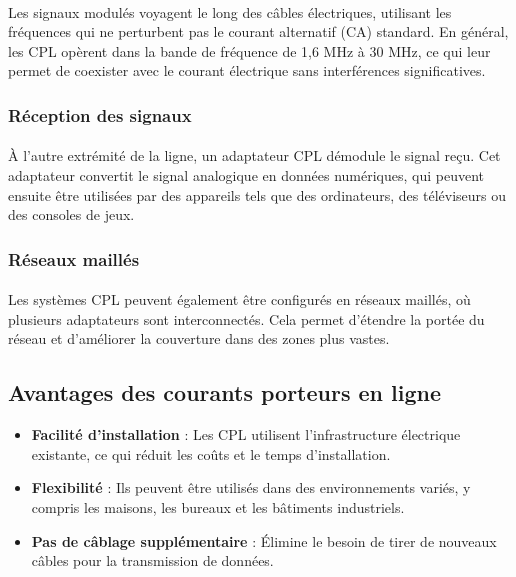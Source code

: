 \documentclass[a4paper,twocolumn]{report}
\begin{document}
\paragraph{} Les signaux modulés voyagent le long des câbles électriques,
utilisant les fréquences qui ne perturbent pas le courant alternatif (CA) standard.
En général, les CPL opèrent dans la bande de fréquence de 1,6 MHz à 30 MHz,
ce qui leur permet de coexister avec le courant électrique sans interférences significatives.

\subsubsection{Réception des signaux}
\paragraph{} À l'autre extrémité de la ligne, un adaptateur CPL démodule le signal reçu.
Cet adaptateur convertit le signal analogique en données numériques,
qui peuvent ensuite être utilisées par des appareils tels que des ordinateurs,
des téléviseurs ou des consoles de jeux.

\subsubsection{Réseaux maillés}
\paragraph{} Les systèmes CPL peuvent également être configurés en réseaux maillés,
où plusieurs adaptateurs sont interconnectés. Cela permet d'étendre la portée du réseau
et d'améliorer la couverture dans des zones plus vastes.

\subsection{Avantages des courants porteurs en ligne}
\begin{itemize}
	\item \textbf{Facilité d'installation} : Les CPL utilisent l'infrastructure
    électrique existante, ce qui réduit les coûts et le temps d'installation.
	\item \textbf{Flexibilité} : Ils peuvent être utilisés dans des environnements variés,
    y compris les maisons, les bureaux et les bâtiments industriels.
	\item \textbf{Pas de câblage supplémentaire} : Élimine le besoin de tirer de
    nouveaux câbles pour la transmission de données.
\end{itemize}
\end{document}
